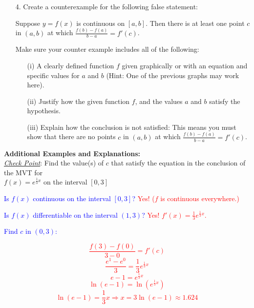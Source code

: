 \documentclass[12pt]{report}
\begin{document}
\newpage
\begin{itemize}
	\item[4.] Create a counterexample for the following false statement: \\

\begin{center}
	Suppose $y=f(x)$ is continuous on $[a,b]$. Then there is at least one point $c$ in $(a,b)$ at which $\displaystyle{\frac{f(b)-f(a)}{b-a}=f'(c)}$.\\
\end{center}
Make sure your counter example includes all of the following:\\
\begin{itemize}
\item[(i)] A clearly defined function $f$ given graphically or with an equation and specific values for $a$ and $b$ (Hint: One of the previous graphs may work here). \\
\vspace{2in}
\item[(ii)] Justify how the given function $f$, and the values $a$ and $b$ satisfy the hypothesis. \\
\vspace{1in}
\item[(iii)] Explain how the conclusion is not satisfied: This means you must show that there are no points $c$ in $(a,b)$
 at which $\displaystyle{\frac{f(b)-f(a)}{b-a}=f'(c)}$.
\end{itemize}
\end{itemize}

\newpage
\textbf{Additional Examples and Explanations:} \\

\emph{\underline{Check Point}}: Find the value(s) of $c$ that satisfy the equation in the conclusion of the MVT for\\
$f(x)=e^{\frac{1}{3}x}$ on the interval $[0,3]$

\bigskip

\textcolor{blue}{Is $f(x)$ continuous on the interval $[0,3]$?} \textcolor{red}{Yes! ($f$ is continuous everywhere.)}

\textcolor{blue}{Is $f(x)$ differentiable on the interval $(1,3)$?} \textcolor{red}{Yes! $f'(x)=\displaystyle{\frac{1}{3}e^{\frac{1}{3}x}}$.}

\textcolor{blue}{Find $c$ in $(0,3)$:} 

\textcolor{red}{$$\frac{f(3)-f(0)}{3-0}=f'(c)$$}
\textcolor{red}{$$\frac{e^{1}-e^{0}}{3}=\displaystyle{\frac{1}{3}e^{\frac{1}{3}x}}$$}
\textcolor{red}{$$e-1=\displaystyle{e^{\frac{1}{3}x}}$$}
\textcolor{red}{$$\ln(e-1)=\ln\left(e^{\frac{1}{3}x}\right)$$}
\textcolor{red}{$$\ln(e-1)=\frac{1}{3}x\Rightarrow x=3\ln(e-1)\approx 1.624$$}
\end{document}
